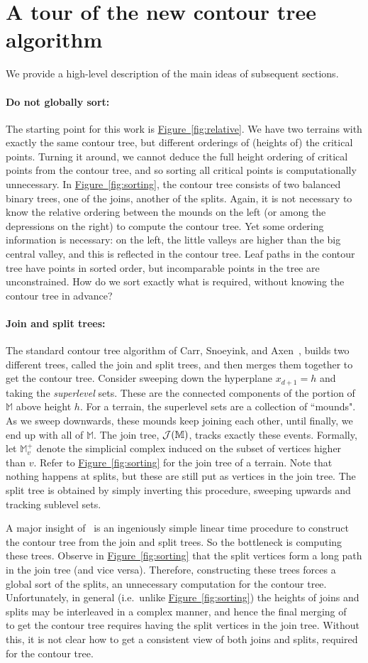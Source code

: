\documentclass[11pt]{article}
\newcommand{\myparagraph}[1]{\paragraph{#1}}
\theoremstyle{definition}
\newcommand{\cJ}{{\cal J}}
\newcommand{\MM}{\mathbb{M}}
\newcommand{\Fig}[1]{\hyperref[fig:#1]{Figure~\ref*{fig:#1}}} %
\begin{document}
\section{A tour of the new contour tree algorithm} \label{sec:approach}
We provide a high-level description of the main ideas of subsequent sections.  

\myparagraph{Do not globally sort:} The starting point for this work is \Fig{relative}. We have two terrains
with exactly the same contour tree, but different orderings of (heights of) the critical points.
Turning it around, we cannot deduce the full height ordering of critical points from the contour tree, and so 
sorting all critical points is computationally unnecessary.
In \Fig{sorting}, the contour tree consists of two balanced binary trees, one of the joins,
another of the splits. Again, it is not necessary to know the relative ordering between the mounds
on the left (or among the depressions on the right) to compute the contour tree. Yet some ordering
information is necessary: on the left, the little valleys are higher than the big central valley,
and this is reflected in the contour tree. Leaf paths in the contour tree have points
in sorted order, but incomparable points in the tree are unconstrained.
How do we sort exactly what is required, without knowing the contour tree in advance?

\myparagraph{Join and split trees:}
The standard contour tree algorithm of Carr, Snoeyink, and Axen~\cite{csa-cctad-03}, builds
two different trees, called the join and split trees, and then merges them together to get the contour tree.
Consider sweeping down the hyperplane $x_{d+1} = h$ and taking the \emph{superlevel} sets. These 
are the connected components of the portion of $\MM$ above height $h$. For a terrain, the superlevel
sets are a collection of ``mounds". As we sweep downwards, these mounds keep joining each other,
until finally, we end up with all of $\MM$. The join tree, $\cJ(\MM)$, tracks exactly these events. 
Formally, let $\MM^+_v$ denote the simplicial complex induced on the subset of 
vertices higher than $v$. 
Refer to \Fig{sorting} for the join tree of a terrain. Note that nothing happens at splits, but these
are still put as vertices in the join tree. The split tree
is obtained by simply inverting this procedure, sweeping upwards and tracking sublevel sets.

A major insight of~\cite{csa-cctad-03} is an ingeniously simple linear time procedure to construct
the contour tree from the join and split trees. So the bottleneck is computing these trees. Observe
in \Fig{sorting} that the split vertices form a long path in the join tree (and vice versa). Therefore, constructing
these trees forces a global sort of the splits, an unnecessary computation for the contour tree. Unfortunately, in general (i.e.\ unlike \Fig{sorting}) 
the heights of joins and splits may be interleaved in a complex manner, and hence the final merging of~\cite{csa-cctad-03}
to get the contour tree requires having the split vertices in the join tree. Without
this, it is not clear how to get a consistent view of both joins and splits, required for the contour tree.
\end{document}
